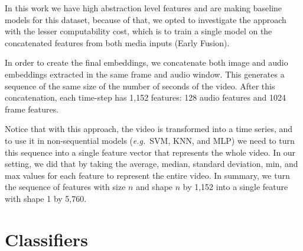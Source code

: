 In this work we have high abstraction level features and are making baseline models for this dataset, because of that, we opted to investigate the approach with the lesser computability cost, which is to train a single model on the concatenated features from both media inputs (Early Fusion).

In order to create the final embeddings, we concatenate both image and audio embeddings extracted in the same frame and audio window. This generates a sequence of the same size of the number of seconds of the video. After this concatenation, each time-step has 1,152 features: 128 audio features and 1024 frame features.

Notice that with this approach, the video is transformed into a time series, and to use it in non-sequential models (\textit{e.g.}~SVM, KNN, and MLP) we need to turn this sequence into a single feature vector that represents the whole video. In our setting, we did that by taking the average, median, standard deviation, min, and max values for each feature to represent the entire video. In summary, we turn the sequence of features with size $n$ and shape $n$ by 1,152 into a single feature with shape 1 by 5,760.

\section{Classifiers}
\label{sec:classifiers}


